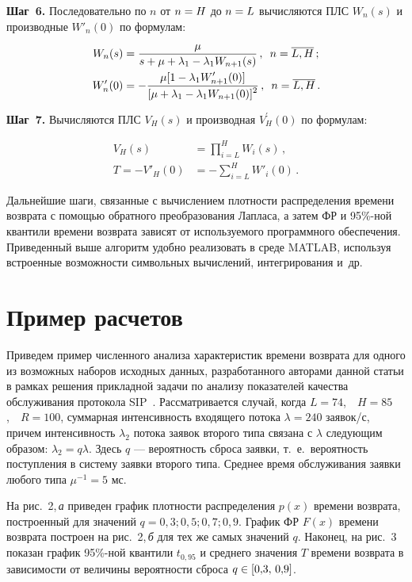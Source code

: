 \begin{multicols}{2}
\textbf{Шаг~6.}
Последовательно по $n$ от $n\hm=H$ до $n\hm=L$
вычисляются ПЛС $W_{n}(s)$ и производные
$W'_{n}(0)$ по формулам:
\begin{align*}
W_{n}(s) &= \displaystyle\frac{\displaystyle \mu\mathstrut}{\displaystyle s + \mu + \lambda_1 - \lambda_1 W_{n+1}(s)\mathstrut}
\,,\enskip n=\overline{L,H}\,;
\\
W'_{n}(0) &= - \displaystyle\frac{\displaystyle \mu [1 - \lambda_1 W'_{n+1}(0) ] \mathstrut}{\displaystyle [\mu + \lambda_1 - \lambda_1 W_{n+1}(0)]^2\mathstrut}
\,,\enskip n=\overline{L,H}\,.
\end{align*}

\textbf{Шаг~7.}
Вычисляются ПЛС $V_{H}(s)$ и производная
$V^{\prime}_{H}(0)$ по формулам:

\noindent
\begin{align*}
V_{H}(s) &= \prod\limits_{i=L}^{H} W_{i}(s) \,,
\\
T = - V'_{H}(0) &=- \sum\limits_{i=L}^{H} W'_{i}(0)\,.
\end{align*}

Дальнейшие шаги, связанные с вычислением плотности распределения
времени возврата с помощью обратного преобразования Лапласа, а затем
ФР и 95\%-ной квантили времени возврата зависят от используемого
программного обеспечения. Приведенный выше алгоритм удобно
реализовать в среде MATLAB, используя встроенные возможности
символьных вычислений, интегрирования и~др.

\vspace*{-6pt}

\section{Пример расчетов}

\vspace*{-2pt}

Приведем пример численного анализа характеристик времени возврата
для одного из возможных наборов исходных данных, разработанного
авторами данной статьи в рамках решения прикладной задачи по анализу
показателей качества обслуживания протокола SIP~\cite{8-pe}. Рассматривается
случай, когда $L=74$,\ \ $H=85$,\ \ $R=100$, суммарная интенсивность
входящего потока $\lambda=240$ заявок/с, причем интенсивность $\lambda_2$
потока заявок второго типа связана с $\lambda$ следующим образом: $\lambda_2=q
\lambda$. Здесь $q$ --- вероятность сброса заявки, т.\ е.\ вероятность
поступления в систему заявки второго типа. Среднее время
обслуживания заявки любого типа $\mu^{-1}=5$ мс.

На рис.~2,\,\textit{а} приведен график плотности распределения $p(x)$ времени
возврата, построенный для значений $q=0{,}3; 0{,}5; 0{,}7; 0{,}9$.
График ФР $F(x)$ времени возврата построен на рис.~2,\,\textit{б} для тех же
самых значений $q$. Наконец, на рис.~3 показан график 95\%-ной
квантили $t_{0{,}95}$ и среднего значения $T$ времени возврата в
зависимости от величины ве\-ро\-ят\-ности сброса $q\hm\in[0{,}3,\,0{,}9]$.


\end{multicols}
